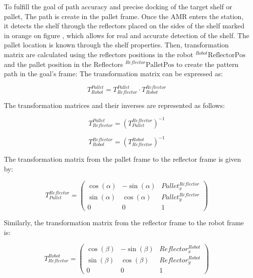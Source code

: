 To fulfill the goal of path accuracy and precise docking of the target shelf or pallet, 
The path is create in the pallet frame. 
Once the AMR enters the station, it detects the shelf through the reflectors placed on 
the sides of the shelf marked in orange on figure , which allows for 
real and accurate detection of the shelf. The pallet location is known through the shelf properties.
Then, transformation matrix are calculated using the reflectors positions in the robot 
$_{ }^{Robot}\text{ReflectorPos}$
and 
the pallet position in the Reflectors $_{ }^{Reflector}\text{PalletPos}$ to create the pattern path 
in the goal's frame:
The transformation matrix can be expressed as:

\begin{equation}
T_{Robot}^{Pallet} = T_{Reflector}^{Pallet} \cdot T_{Robot}^{Reflector}
\end{equation}

The transformation matrices and their inverses are represented as follows:

\begin{equation}
T_{Reflector}^{Pallet} = \left( T_{Pallet}^{Reflector} \right)^{-1}
\end{equation}

\begin{equation}
T_{Robot}^{Reflector} = \left( T_{Reflector}^{Robot} \right)^{-1}
\end{equation}

The transformation matrix from the pallet frame to the reflector frame is given by:

\begin{equation}
T_{Pallet}^{Reflector} = 
\begin{pmatrix}
\cos(\alpha) & -\sin(\alpha) & Pallet_{x}^{Reflector} \\
\sin(\alpha) & \cos(\alpha) & Pallet_{y}^{Reflector} \\
0 & 0 & 1
\end{pmatrix}
\end{equation}

Similarly, the transformation matrix from the reflector frame to the robot frame is:

\begin{equation}
T_{Reflector}^{Robot} = 
\begin{pmatrix}
\cos(\beta) & -\sin(\beta) & Reflector_{x}^{Robot} \\
\sin(\beta) & \cos(\beta) & Reflector_{y}^{Robot} \\
0 & 0 & 1
\end{pmatrix}
\end{equation}

